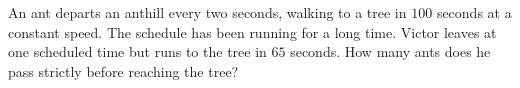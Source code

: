 An ant departs an anthill every two seconds, walking to a tree in $100$ seconds at a constant speed. The schedule has been running for a long time. Victor leaves at one scheduled time but runs to the tree in $65$ seconds. How many ants does he pass strictly before reaching the tree?
